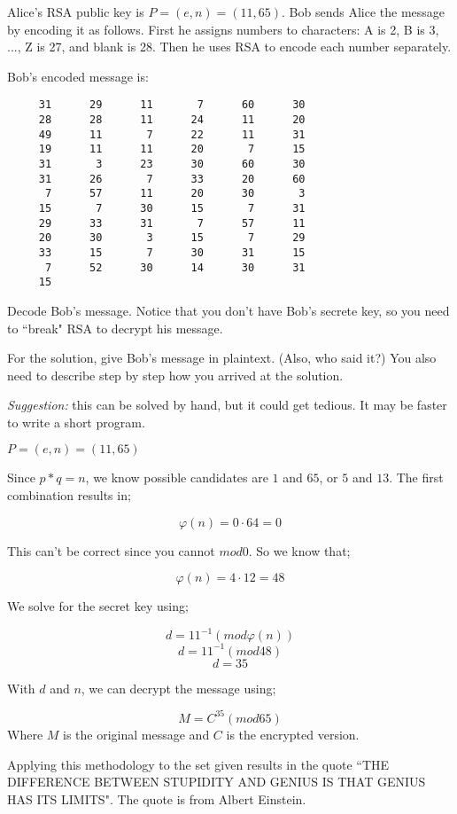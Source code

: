 
\begin{problem}
Alice's RSA public key is $P = (e,n) = (11,65)$.
Bob sends Alice the message by encoding it as follows.
First he assigns numbers to characters:
A is 2, B is 3, ..., Z is 27, and blank is 28. Then he
uses RSA to encode each number separately. 

Bob's encoded message is:

\begin{verbatim}
     31      29      11       7      60      30
     28      28      11      24      11      20
     49      11       7      22      11      31
     19      11      11      20       7      15
     31       3      23      30      60      30
     31      26       7      33      20      60
      7      57      11      20      30       3
     15       7      30      15       7      31
     29      33      31       7      57      11
     20      30       3      15       7      29
     33      15       7      30      31      15
      7      52      30      14      30      31
     15
\end{verbatim}

Decode Bob's message.
Notice that you don't have Bob's secrete key, so you
need to ``break" RSA to decrypt his message.

For the solution, give Bob's message in plaintext. (Also, who said it?)
You also need to describe step by step how you arrived at the solution. 

\emph{Suggestion:} this can be solved by hand, but it could get tedious. It may
be faster to write a short program.
\end{problem}

\begin{solution}

$P = (e,n) = (11,65)$

Since $p * q = n$, we know possible candidates are $1$ and $65$, or $5$ and $13$.
The first combination results in; 

\[ \varphi(n) = 0 \cdot 64 = 0 \]

This can't be correct since you cannot $mod 0$. So we know that;

\[ \varphi(n) = 4 \cdot 12 = 48 \]

We solve for the secret key using;

\[ d = 11^{-1}(mod \varphi(n)) \]
\[ d = 11^{-1}(mod 48) \]
\[ d = 35 \]

With $d$ and $n$, we can decrypt the message using;

\[ M = C^{35}(mod 65) \]
Where $M$ is the original message and $C$ is the encrypted version.

Applying this methodology to the set given results in the quote ``THE DIFFERENCE BETWEEN STUPIDITY AND GENIUS IS THAT GENIUS HAS ITS LIMITS". The quote is from Albert Einstein.
\end{solution}
